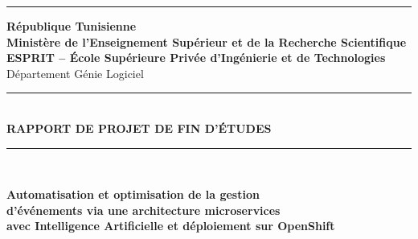 \documentclass[12pt,a4paper]{report}
\begin{document}

\begin{titlepage}
\pagestyle{empty}
\begin{center}

\begin{minipage}{0.42\textwidth}
  \centering
\end{minipage}
\hfill
\begin{minipage}{0.42\textwidth}
  \centering
\end{minipage}

\vspace{0.4cm}
\noindent\rule{\linewidth}{0.5pt}
\vspace{0.2cm}

{\small\textbf{R\'epublique Tunisienne}}\\
{\small\textbf{Minist\`ere de l'Enseignement Sup\'erieur et de la Recherche Scientifique}}\\[0.4cm]
{\large\textbf{ESPRIT -- \'Ecole Sup\'erieure Priv\'ee d'Ing\'enierie et de Technologies}}\\[0.2cm]
{\normalsize D\'epartement G\'enie Logiciel}\\[0.3cm]

\noindent\rule{\linewidth}{0.5pt}\\[0.3cm]

{\LARGE\textbf{RAPPORT DE PROJET DE FIN D'\'ETUDES}}\\[0.4cm]

\noindent\rule{\linewidth}{1.5pt}\\[0.5cm]

\begin{minipage}{\textwidth}
\centering
{\Large\textbf{Automatisation et optimisation de la gestion\\[0.25cm]
d'\'ev\'enements via une architecture microservices\\[0.25cm]
avec Intelligence Artificielle et d\'eploiement sur OpenShift}}
\end{minipage}


\end{center}
\end{titlepage}
\end{document}
